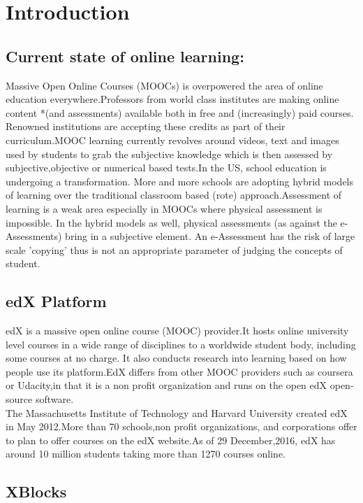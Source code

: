 \documentclass{scrreprt}
\begin{document}
\chapter{Introduction}

\section{Current state of online learning:}
Massive Open Online Courses (MOOCs) is overpowered the area of online education everywhere.Professors from world class 
institutes are making online content *(and assessments) available both in free and (increasingly) paid courses. Renowned
institutions are accepting these credits as part of their curriculum.MOOC learning currently revolves around videos, text
and images used by students to grab the subjective knowledge which is then assessed by subjective,objective or numerical 
based tests.In the US, school education is undergoing a transformation. More and more schools are adopting hybrid models 
of learning over the traditional classroom based (rote) approach.Assessment of learning is a weak area especially in MOOCs 
where physical assessment is impossible. In the hybrid models as well, physical assessments (as against the e-Assessments) 
bring in a subjective element. An e-Assessment has the risk of large scale 'copying' thus is not an appropriate parameter of
judging the concepts of student.

\section{edX Platform}

edX is a massive open online course (MOOC) provider.It hosts online university level courses in a wide range of disciplines
to a worldwide student body, including some courses at no charge. It also conducts research into learning based on how people 
use its platform.EdX differs from other MOOC providers such as coursera or Udacity,in that it is a non profit organization and 
runs on the open edX open-source software.\\
The Massachusetts Institute of Technology and Harvard University created edX in May 2012.More than 70 schools,non profit 
organizations, and corporations offer to plan to offer courses on the edX website.As of 29 December,2016, edX has around 10
million students taking more than 1270 courses online.

\section{XBlocks}
\end{document}
